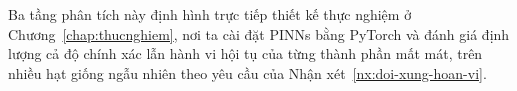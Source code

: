 Ba tầng phân tích này định hình trực tiếp thiết kế thực nghiệm ở
Chương~\ref{chap:thucnghiem}, nơi ta cài đặt PINNs bằng PyTorch và đánh giá định
lượng cả độ chính xác lẫn hành vi hội tụ của từng thành phần mất mát, trên nhiều
hạt giống ngẫu nhiên theo yêu cầu của Nhận xét~\ref{nx:doi-xung-hoan-vi}.
 